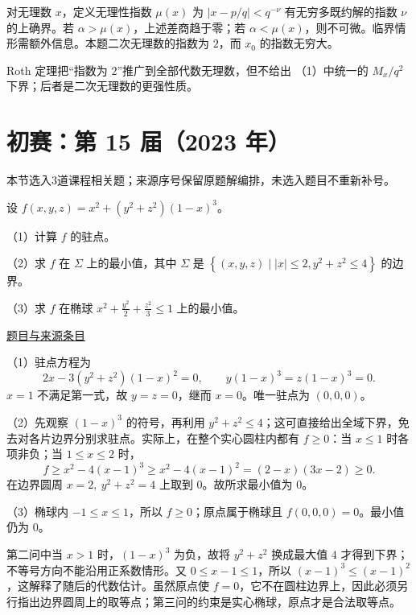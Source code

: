 \documentclass[UTF8,12pt,a4paper,fontset=fandol]{ctexart}
\begin{document}
\begin{remark}[方法与条件]对无理数 $x$，定义无理性指数 $\mu(x)$ 为 $|x-p/q|<q^{-\nu}$ 有无穷多既约解的指数 $\nu$ 的上确界。若 $\alpha>\mu(x)$，上述差商趋于零；若 $\alpha<\mu(x)$，则不可微。临界情形需额外信息。本题二次无理数的指数为 $2$，而 $x_0$ 的指数无穷大。

Roth 定理把“指数为 $2$”推广到全部代数无理数，但不给出 （1）中统一的 $M_x/q^2$ 下界；后者是二次无理数的更强性质。\end{remark}

\section{初赛：第 15 届（2023 年）}

本节选入3道课程相关题；来源序号保留原题解编排，未选入题目不重新补号。

\begin{example}[来源序号2]\label{ex:ch03-15th-A:2}\label{pr:ch03-15th-A:2}

设 $f(x,y,z) = x^2 + \left(y^2 + z^2\right)(1-x)^3$。

（1）计算 $f$ 的驻点。

（2）求 $f$ 在 $\Sigma$ 上的最小值，其中 $\Sigma$ 是 $\left\{(x,y,z) \mid |x| \leq 2, y^2 + z^2 \leq 4\right\}$ 的边界。

（3）求 $f$ 在椭球 $x^2 + \frac{y^2}{2} + \frac{z^2}{3} \leq 1$ 上的最小值。

\par\href{https://github.com/lzxcr/cmc-mathematics/blob/64916fa1fdbc3e444a652eca204d5669058ee321/src/problems/preliminary/15/02.md}{题目与来源条目}

\end{example}

\begin{solve}\label{ans:ch03-15th-A:2}

（1）驻点方程为
\[
2x-3(y^2+z^2)(1-x)^2=0,\qquad
 y(1-x)^3=z(1-x)^3=0.
\]
$x=1$ 不满足第一式，故 $y=z=0$，继而 $x=0$。唯一驻点为 $(0,0,0)$。

（2）先观察 $(1-x)^3$ 的符号，再利用 $y^2+z^2\leq4$；这可直接给出全域下界，免去对各片边界分别求驻点。实际上，在整个实心圆柱内都有 $f\geq0$：当 $x\leq1$ 时各项非负；当 $1\leq x\leq2$ 时，
\[
f\geq x^2-4(x-1)^3
\geq x^2-4(x-1)^2=(2-x)(3x-2)\geq0.
\]
在边界圆周 $x=2,\ y^2+z^2=4$ 上取到 $0$。故所求最小值为 $0$。

（3）椭球内 $-1\leq x\leq1$，所以 $f\geq0$；原点属于椭球且 $f(0,0,0)=0$。最小值仍为 $0$。

第二问中当 $x>1$ 时，$(1-x)^3$ 为负，故将 $y^2+z^2$ 换成最大值 $4$ 才得到下界；不等号方向不能沿用正系数情形。又 $0\le x-1\le1$，所以 $(x-1)^3\le(x-1)^2$，这解释了随后的代数估计。虽然原点使 $f=0$，它不在圆柱边界上，因此必须另行指出边界圆周上的取等点；第三问的约束是实心椭球，原点才是合法取等点。

\end{solve}
\end{document}
